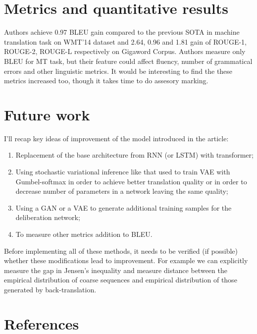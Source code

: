 \documentclass{article}
\begin{document}
\section{Metrics and quantitative results}
	Authors achieve 0.97 BLEU gain compared to the previous SOTA in machine translation task on WMT'14 dataset and 2.64, 0.96 and 1.81 gain of ROUGE-1, ROUGE-2, ROUGE-L respectively on Gigaword Corpus. Authors measure only BLEU for MT task, but their feature could affect fluency, number of grammatical errors and other linguistic metrics. It would be interesting to find the these metrics increased too, though it takes time to do assesory marking.

\section{Future work}
I'll recap key ideas of improvement of the model introduced in the article:
\begin{enumerate}[leftmargin=0.45cm]
	\item Replacement of the base architecture from RNN (or LSTM) with transformer;
	\item Using stochastic variational inference like that used to train VAE with Gumbel-softmax in order to achieve better translation quality or in order to decrease number of parameters in a network leaving the same quality;
	\item Using a GAN or a VAE to generate additional training samples for the deliberation network;
	\item To measure other metrics addition to BLEU.
\end{enumerate}

	Before implementing all of these methods, it needs to be verified (if possible) whether these modifications lead to improvement. For example we can explicitly measure the gap in Jensen's inequality and measure distance between the empirical distribution of coarse sequences and empirical distribution of those generated by back-translation.

\section*{References}
\medskip

\small
\end{document}
